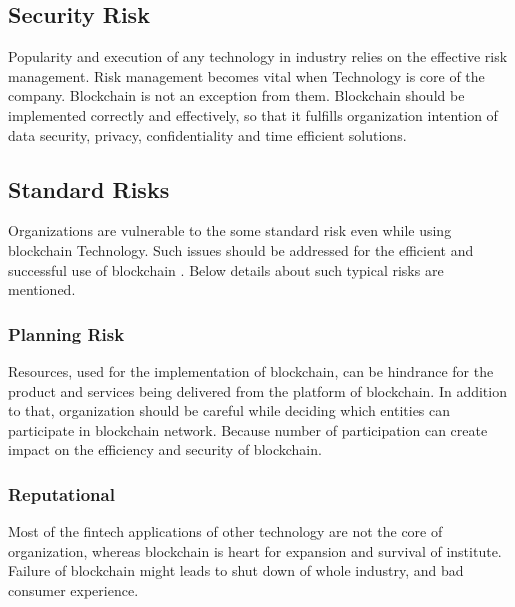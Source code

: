 \documentclass[a4paper,twoside,12pt]{report}
\begin{document}
\begin{spacing}{1.5}
\section{Security Risk}
Popularity and execution of any technology in industry relies on the effective risk management. Risk management becomes vital when Technology is core of the company. Blockchain is not an exception from them. Blockchain should be implemented correctly and effectively, so that it fulfills organization intention of data security, privacy, confidentiality and time efficient solutions.
\subsection{Standard Risks}
Organizations are vulnerable to the some standard risk even while using blockchain Technology. Such issues should be addressed for the efficient and successful use of blockchain \cite{securityrisk}. Below details about such typical risks are mentioned. 
\subsubsection{Planning Risk}
Resources, used for the implementation of blockchain, can be hindrance for the product and services being delivered from the platform of blockchain. In addition to that, organization should be careful while deciding which entities can participate in blockchain network. Because number of participation can create impact on the efficiency and security of blockchain.    
\subsubsection{Reputational}
Most of the fintech applications of other technology are not the core of organization, whereas blockchain is heart for expansion and survival of institute. Failure of blockchain might leads to shut down of whole industry, and bad consumer experience.   

\end{spacing}
\end{document}
